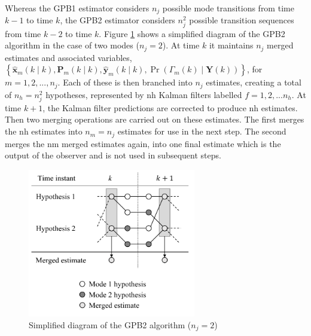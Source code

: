 Whereas the \gls{GPB1} estimator considers $n_j$ possible mode transitions from time $k-1$ to time $k$, the \gls{GPB2} estimator considers $n_j^2$ possible transition sequences from time $k-2$ to time $k$. Figure \ref{fig:mm-obs-gpb2} shows a simplified diagram of the \gls{GPB2} algorithm in the case of two modes ($n_j=2$). At time $k$ it maintains $n_j$ merged estimates and associated variables, $\left\{ \hat{\mathbf{x}}_m(k \mid k), \mathbf{P}_m(k \mid k), \hat{\mathbf{y}}_m(k \mid k), \Pr(\Gamma_m(k) \mid \mathbf{Y}(k)) \right\}$, for $m=1,2,...,n_j$. Each of these is then branched into $n_j$ estimates, creating a total of $n_h=n_j^2$ hypotheses, represented by \gls{nh} Kalman filters labelled $f=1,2,...n_h$. At time $k+1$, the Kalman filter predictions are corrected to produce \gls{nh} estimates. Then two merging operations are carried out on these estimates. The first merges the \gls{nh} estimates into $n_m=n_j$ estimates for use in the next step. The second merges the \gls{nm} merged estimates again, into one final estimate which is the output of the observer and is not used in subsequent steps.
\begin{figure}[htp]
	\centering
	\includegraphics[height=6.5cm]{images/gpb2_diagram.pdf}
	\caption{Simplified diagram of the \gls{GPB2} algorithm ($n_j=2$)}
	\label{fig:mm-obs-gpb2}
\end{figure}

